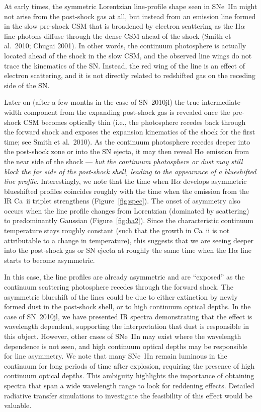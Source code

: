 \documentclass{emulateapj}
\begin{document}
At early times, the symmetric Lorentzian line-profile shape seen in
SNe~IIn might not arise from the post-shock gas at all, but instead
from an emission line formed in the slow pre-shock CSM
that is broadened by electron scattering as the H$\alpha$ line photons
diffuse through the dense CSM ahead of the shock (Smith et al.\ 2010;
Chugai 2001).  In other words, the continuum photosphere is actually
located ahead of the shock in the slow CSM, and the observed line
wings do not trace the kinematics of the SN.  Instead, the red wing of
the line is an effect of electron scattering, and it is not directly
related to redshifted gas on the receding side of the SN.

Later on (after a few months in the case of SN~2010jl) the true
intermediate-width component from the expanding post-shock gas is
revealed once the pre-shock CSM becomes optically thin (i.e., the
photosphere recedes back through the forward shock and exposes the
expansion kinematics of the shock for the first time; see Smith et
al.\ 2010).  As the continuum photosphere recedes deeper into the
post-shock zone or into the SN ejecta, it may then reveal H$\alpha$
emission from the near side of the shock --- {\it but the continuum
  photosphere or dust may still block the far side of the post-shock
  shell, leading to the appearance of a blueshifted line profile}.
Interestingly, we note that the time when H$\alpha$ develops
asymmetric blueshifted profiles coincides roughly with the time when
the emission from the IR Ca~{\sc ii} triplet strengthens
(Figure~\ref{fig:spec}).  The onset of asymmetry also occurs when the
line profile changes from Lorentzian (dominated by scattering)
to predominantly Gaussian (Figure~\ref{fig:ha2}).  Since the
characteristic continuum temperature stays roughly constant (such that
the growth in Ca~{\sc ii} is not attributable to a change in
temperature), this suggests that we are seeing deeper into the 
post-shock gas or SN ejecta at roughly the same time when the 
H$\alpha$ line starts to become asymmetric.

In this case, the line profiles are already asymmetric and are
``exposed'' as the continuum scattering photosphere recedes through
the forward shock.  The asymmetric blueshift of the lines could be due
to either extinction by newly formed dust in the post-shock shell, or
to high continuum optical depths.  In the case of
SN~2010jl, we have presented IR spectra demonstrating that the effect
is wavelength dependent, supporting the interpretation that dust is
responsible in this object.  However, other cases of SNe~IIn may exist
where the wavelength dependence is not seen, and high
continuum optical depths may be responsible for line asymmetry. We
note that many SNe~IIn remain luminous in the continuum for long
periods of time after explosion, requiring the presence of high
continuum optical depths.  This ambiguity highlights the importance of
obtaining spectra that span a wide wavelength range to look for
reddening effects.  Detailed radiative transfer simulations to
investigate the feasibility of this effect would be valuable.
\end{document}
